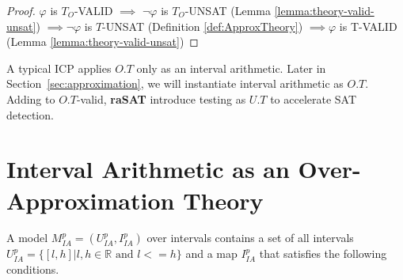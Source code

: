 \begin{proof}
$\varphi$ is $T_O$-VALID $\implies$ $\neg\varphi$ is $T_O$-UNSAT (Lemma \ref{lemma:theory-valid-unsat}) $\implies \neg\varphi$ is $T$-UNSAT (Definition \ref{def:ApproxTheory}) $\implies \varphi$ is T-VALID (Lemma \ref{lemma:theory-valid-unsat})
\end{proof}

A typical ICP applies $O.T$ only as an interval arithmetic. 
Later in Section~\ref{sec:approximation}, we will instantiate interval arithmetic as $O.T$. 
Adding to $O.T$-valid, {\bf raSAT} introduce testing as $U.T$ to accelerate SAT detection. 

\section{Interval Arithmetic as an Over-Approximation Theory}
A model $M^p_{IA} = (U^p_{IA}, I^p_{IA})$ over intervals contains a set of all intervals $U^p_{IA} = \{[l, h] | l, h \in \mathbb{R} \text{ and } l <= h\}$ and a map $I^p_{IA}$ that satisfies the following conditions.
